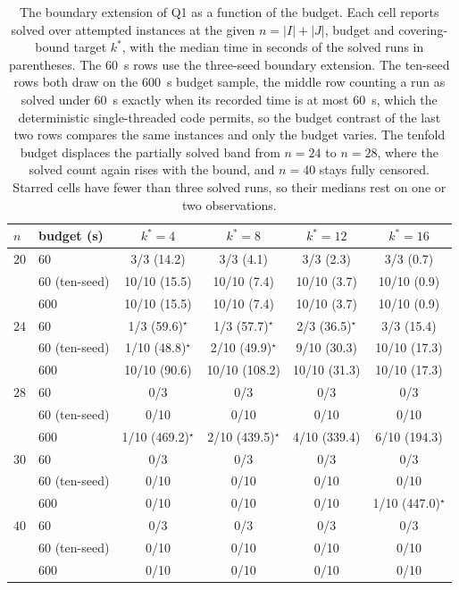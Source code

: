 \begin{table}[H]
\centering
\caption{The boundary extension of Q1 as a function of the budget. Each
cell reports solved over attempted instances at the given $n=|I|+|J|$,
budget and covering-bound target $k^\ast$, with the median time in
seconds of the solved runs in parentheses. The $60$~s rows use the
three-seed boundary extension. The ten-seed rows both draw on the
$600$~s budget sample, the middle row counting a run as solved under
$60$~s exactly when its recorded time is at most $60$~s, which the
deterministic single-threaded code permits, so the budget contrast of
the last two rows compares the same instances and only the budget
varies. The tenfold budget displaces the
partially solved band from $n=24$ to $n=28$, where the solved count
again rises with the bound, and $n=40$ stays fully censored. Starred
cells have fewer than three solved runs, so their medians rest on one
or two observations.}
\label{tab:q1boundary}
\setlength{\tabcolsep}{3.2pt}
\begin{tabular}{llcccc}
\hline
$n$ & budget (s) & $k^\ast=4$ & $k^\ast=8$ & $k^\ast=12$ & $k^\ast=16$ \\
\hline
$20$ & $60$ & 3/3 (14.2) & 3/3 (4.1) & 3/3 (2.3) & 3/3 (0.7) \\
 & $60$ (ten-seed) & 10/10 (15.5) & 10/10 (7.4) & 10/10 (3.7) & 10/10 (0.9) \\
 & $600$ & 10/10 (15.5) & 10/10 (7.4) & 10/10 (3.7) & 10/10 (0.9) \\
\addlinespace[2pt]
$24$ & $60$ & 1/3 (59.6)$^{\star}$ & 1/3 (57.7)$^{\star}$ & 2/3 (36.5)$^{\star}$ & 3/3 (15.4) \\
 & $60$ (ten-seed) & 1/10 (48.8)$^{\star}$ & 2/10 (49.9)$^{\star}$ & 9/10 (30.3) & 10/10 (17.3) \\
 & $600$ & 10/10 (90.6) & 10/10 (108.2) & 10/10 (31.3) & 10/10 (17.3) \\
\addlinespace[2pt]
$28$ & $60$ & 0/3 & 0/3 & 0/3 & 0/3 \\
 & $60$ (ten-seed) & 0/10 & 0/10 & 0/10 & 0/10 \\
 & $600$ & 1/10 (469.2)$^{\star}$ & 2/10 (439.5)$^{\star}$ & 4/10 (339.4) & 6/10 (194.3) \\
\addlinespace[2pt]
$30$ & $60$ & 0/3 & 0/3 & 0/3 & 0/3 \\
 & $60$ (ten-seed) & 0/10 & 0/10 & 0/10 & 0/10 \\
 & $600$ & 0/10 & 0/10 & 0/10 & 1/10 (447.0)$^{\star}$ \\
\addlinespace[2pt]
$40$ & $60$ & 0/3 & 0/3 & 0/3 & 0/3 \\
 & $60$ (ten-seed) & 0/10 & 0/10 & 0/10 & 0/10 \\
 & $600$ & 0/10 & 0/10 & 0/10 & 0/10 \\
\hline
\end{tabular}
\end{table}
